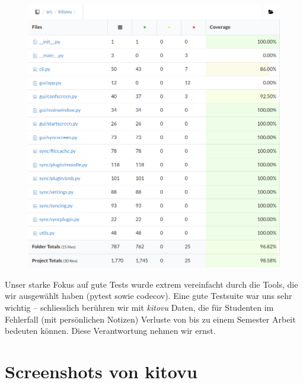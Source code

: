 \documentclass[a4paper]{article}
\let\oldsection\section
\renewcommand\section{\clearpage\oldsection}
\begin{document}
\begin{figure}
\includegraphics[width=0.97\linewidth]{img/coverage_files.png}
\end{figure}

Unser starke Fokus auf gute Tests wurde extrem vereinfacht durch die Tools, die wir ausgewählt haben (pytest sowie codecov). Eine gute Testsuite war uns sehr
wichtig -- schliesslich berühren wir mit \emph{kitovu} Daten, die für Studenten
im Fehlerfall (mit persönlichen Notizen) Verluste von bis zu einem Semester
Arbeit bedeuten können. Diese Verantwortung nehmen wir ernst.

\section{Screenshots von kitovu}
\end{document}
